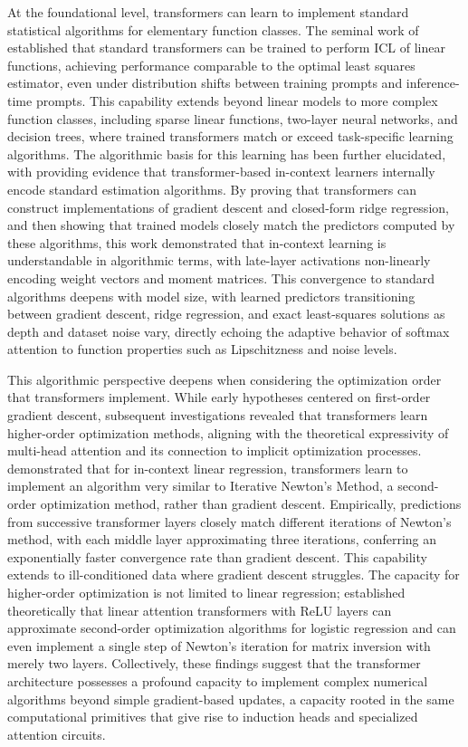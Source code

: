 \documentclass[11pt]{article}
\begin{document}
At the foundational level, transformers can learn to implement standard statistical algorithms for elementary function classes. The seminal work of \cite{ref102} established that standard transformers can be trained to perform ICL of linear functions, achieving performance comparable to the optimal least squares estimator, even under distribution shifts between training prompts and inference-time prompts. This capability extends beyond linear models to more complex function classes, including sparse linear functions, two-layer neural networks, and decision trees, where trained transformers match or exceed task-specific learning algorithms. The algorithmic basis for this learning has been further elucidated, with \cite{ref103} providing evidence that transformer-based in-context learners internally encode standard estimation algorithms. By proving that transformers can construct implementations of gradient descent and closed-form ridge regression, and then showing that trained models closely match the predictors computed by these algorithms, this work demonstrated that in-context learning is understandable in algorithmic terms, with late-layer activations non-linearly encoding weight vectors and moment matrices. This convergence to standard algorithms deepens with model size, with learned predictors transitioning between gradient descent, ridge regression, and exact least-squares solutions as depth and dataset noise vary, directly echoing the adaptive behavior of softmax attention to function properties such as Lipschitzness and noise levels.

This algorithmic perspective deepens when considering the optimization order that transformers implement. While early hypotheses centered on first-order gradient descent, subsequent investigations revealed that transformers learn higher-order optimization methods, aligning with the theoretical expressivity of multi-head attention and its connection to implicit optimization processes. \cite{ref104} demonstrated that for in-context linear regression, transformers learn to implement an algorithm very similar to Iterative Newton's Method, a second-order optimization method, rather than gradient descent. Empirically, predictions from successive transformer layers closely match different iterations of Newton's method, with each middle layer approximating three iterations, conferring an exponentially faster convergence rate than gradient descent. This capability extends to ill-conditioned data where gradient descent struggles. The capacity for higher-order optimization is not limited to linear regression; \cite{ref105} established theoretically that linear attention transformers with ReLU layers can approximate second-order optimization algorithms for logistic regression and can even implement a single step of Newton's iteration for matrix inversion with merely two layers. Collectively, these findings suggest that the transformer architecture possesses a profound capacity to implement complex numerical algorithms beyond simple gradient-based updates, a capacity rooted in the same computational primitives that give rise to induction heads and specialized attention circuits.
\end{document}
